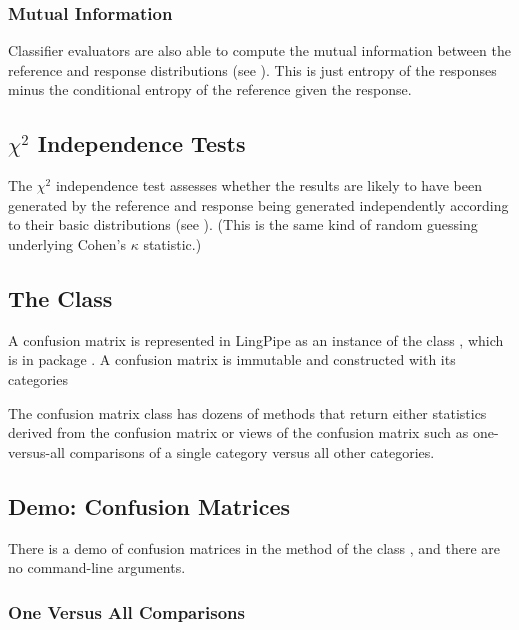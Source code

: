\subsubsection{Mutual Information}

Classifier evaluators are also able to compute the mutual information
between the reference and response distributions (see
).  This is just entropy of the
responses minus the conditional entropy of the reference given the
response.

\subsection{$\chi^2$ Independence Tests}

The $\chi^2$ independence test assesses whether the results are likely
to have been generated by the reference and response being generated
independently according to their basic distributions (see
).  (This is the same kind of random guessing
underlying Cohen's $\kappa$ statistic.)






\subsection{The  Class}

A confusion matrix is represented in LingPipe as an instance of the
class , which is in package
.  A confusion matrix is immutable and
constructed with its categories


The confusion matrix class has dozens of methods that return either
statistics derived from the confusion matrix or views of the confusion
matrix such as one-versus-all comparisons of a single category versus
all other categories.




\subsection{Demo: Confusion Matrices}

There is a demo of confusion matrices in the  method of
the class , and there are no command-line
arguments.
%
%



\subsubsection{One Versus All Comparisons}



